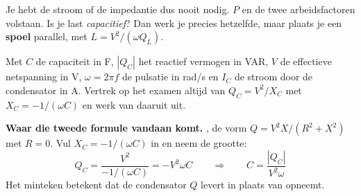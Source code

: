 \documentclass[a4paper,11pt]{article}
\begin{document}
Je hebt de stroom of de impedantie dus nooit nodig. $P$ en de twee arbeidsfactoren volstaan.
Is je last \emph{capacitief}? Dan werk je precies hetzelfde, maar plaats je een \textbf{spoel}
parallel, met $L = V^2/(\omega Q_L)$.

{Met $C$ de capaciteit in F, $|Q_C|$ het reactief vermogen in VAR, $V$ de effectieve netspanning in
    V, $\omega = 2\pi f$ de pulsatie in rad/s en $I_C$ de stroom door de condensator in A.
    Vertrek op het examen altijd van $Q_C = V^2/X_C$ met $X_C = -1/(\omega C)$ en werk van daaruit uit.}

\textbf{Waar die tweede formule vandaan komt.} , de vorm $Q = V^2X/(R^2+X^2)$ met $R = 0$. Vul
$X_C = -1/(\omega C)$ in en neem de grootte:
\[Q_C = \frac{V^2}{-1/(\omega C)} = -V^2\omega C
    \qquad\Longrightarrow\qquad
    \boxed{C = \frac{|Q_C|}{V^2\omega}}\]
Het minteken betekent dat de condensator $Q$ levert in plaats van opneemt.
\end{document}
